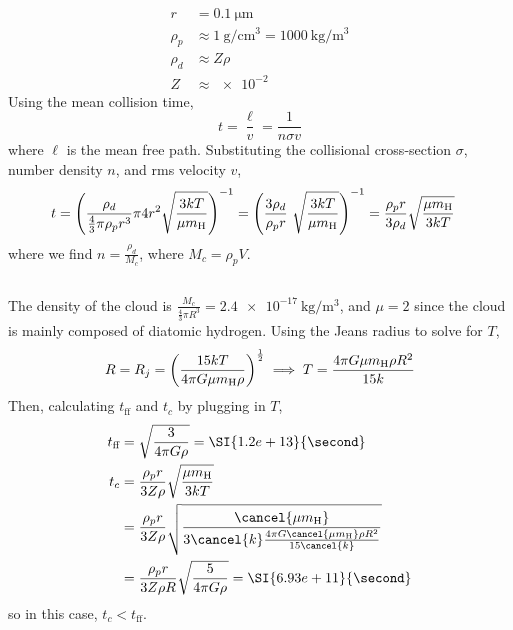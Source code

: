 \documentclass{article}
\begin{document}
\subsection{}

\begin{align}
    r &= \SI{0.1}{\micro\meter} \\
    \rho_p &\approx \SI{1}{\gram\per\centi\meter\cubed} = \SI{1000}{\kilogram\per\meter\cubed} \\
    \rho_d &\approx Z \rho \\
    Z &\approx \num{e-2}
\end{align}
Using the mean collision time,
\begin{equation}
    t = \frac{\ell}{v} = \frac{1}{n \sigma v}
\end{equation}
where \(\ell\) is the mean free path.
Substituting the collisional cross-section \(\sigma\), number density \(n\), and rms velocity \(v\), 
\begin{align}
    t &= \left(\frac{\rho_d}{\frac{4}{3} \pi \rho_p r^3} \pi 4r^2 \sqrt{\frac{3kT}{\mu m_{\ce{H}}}}\right)^{-1} = \left(\frac{3 \rho_d}{\rho_p r}\ \sqrt{\frac{3kT}{\mu m_{\ce{H}}}}\right)^{-1} = \frac{\rho_p r}{3 \rho_d} \sqrt{\frac{\mu m_{\ce{H}}}{3kT}}
\end{align}
where we find \(n = \frac{\rho_d}{M_c}\), where \(M_c = \rho_p V\).

\subsection{}

The density of the cloud is \(\frac{M_c}{\frac{4}{3} \pi R^3} = \SI{2.4e-17}{\kilogram\per\meter\cubed}\), and \(\mu = 2\) since the cloud is mainly composed of diatomic hydrogen.
Using the Jeans radius to solve for \(T\),
\begin{equation}
    R = R_j = \left(\frac{15kT}{4 \pi G \mu m_{\ce{H}} \rho}\right)^{\frac{1}{2}} \implies T = \frac{4 \pi G \mu m_{\ce{H}} \rho R^2}{15k}
\end{equation}
Then, calculating \(t_{\text{ff}}\) and \(t_c\) by plugging in \(T\),
\begin{align}
    t_{\text{ff}} &= \sqrt{\frac{3}{4 \pi G \rho}} = \SI{1.2e+13}{\second} \\
    t_c &= \frac{\rho_p r}{3 Z \rho} \sqrt{\frac{\mu m_{\ce{H}}}{3kT}} \\
    &= \frac{\rho_p r}{3 Z \rho} \sqrt{\frac{\cancel{\mu m_{\ce{H}}}}{3\cancel{k}\frac{4 \pi G \cancel{\mu m_{\ce{H}}} \rho R^2}{15\cancel{k}}}} \\
    &= \frac{\rho_p r}{3 Z \rho R} \sqrt{\frac{5}{4 \pi G \rho}} = \SI{6.93e+11}{\second}
\end{align}
so in this case, \(t_c < t_{\text{ff}}\).
\end{document}
